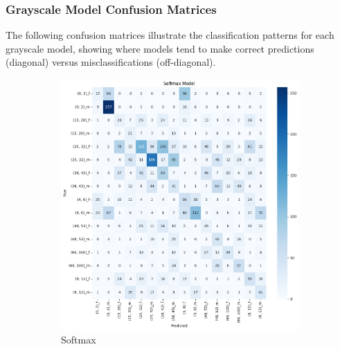 \documentclass{article}
\begin{document}
\subsubsection{Grayscale Model Confusion Matrices}

The following confusion matrices illustrate the classification patterns for each grayscale model, showing where models tend to make correct predictions (diagonal) versus misclassifications (off-diagonal).

\begin{figure}[H]
    \centering
    \begin{subfigure}[b]{0.48\textwidth}
        \includegraphics[width=\textwidth]{assets/confusion_matrix/grayscale/Softmax Model.png}
        \caption{Softmax}
    \end{subfigure}
    \hfill
    \begin{subfigure}[b]{0.48\textwidth}

\end{subfigure}
\end{figure}
\end{document}

